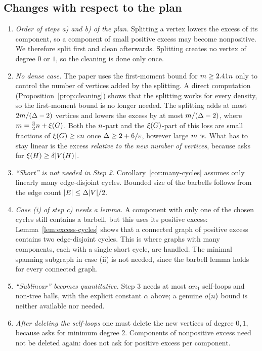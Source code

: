 \documentclass[11pt,a4paper]{article}
\theoremstyle{definition}
\theoremstyle{remark}
\theoremstyle{plain}
\theoremstyle{definition}
\begin{document}
\subsection{Changes with respect to the plan}
\begin{enumerate}[label=(\arabic*)]
\item \emph{Order of steps a) and b) of the plan.} Splitting a vertex lowers the excess of its
  component, so a component of small positive excess may become nonpositive.
  We therefore split first and clean afterwards. Splitting creates no vertex
  of degree \(0\) or \(1\), so the cleaning is done only once.
\item \emph{No dense case.} The paper uses the first-moment bound for
  \(m\ge2.41n\) only to control the number of vertices added by the splitting.
  A direct computation (Proposition~\ref{prop:cleaning}) shows that the
  splitting works for every density, so the first-moment bound is no longer
  needed. The splitting adds at most \(2m/(\Delta-2)\) vertices and lowers the
  excess by at most \(m/(\Delta-2)\), where \(m=\frac32n+\xi(G)\). Both the
  \(n\)-part and the \(\xi(G)\)-part of this loss are small fractions of
  \(\xi(G)\ge\varepsilon n\) once \(\Delta\ge2+6/\varepsilon\), however large
  \(m\) is. What has to stay linear is the excess \emph{relative to the new
  number of vertices}, because \Hyp{} asks for \(\xi(H)\ge\delta|V(H)|\).
\item \emph{``Short'' is not needed in Step 2.} Corollary~\ref{cor:many-cycles}
  assumes only linearly many edge-disjoint cycles. Bounded size of the barbells
  follows from the edge count \(|E|\le\Delta|V|/2\).
\item \emph{Case (i) of step c) needs a lemma.} A component with only one of
  the chosen cycles still contains a barbell, but this uses its positive excess:
  Lemma~\ref{lem:excess-cycles} shows that a connected graph of positive
  excess contains two edge-disjoint cycles. This is where graphs with many
  components, each with a single short cycle, are handled. The minimal
  spanning subgraph in case (ii) is not needed, since the barbell lemma holds
  for every connected graph.
\item \emph{``Sublinear'' becomes quantitative.} Step 3 needs at most
  \(\alpha n_1\) self-loops and non-tree balls, with the explicit constant
  \(\alpha\) above; a genuine \(o(n)\) bound is neither available nor needed.
\item \emph{After deleting the self-loops} one must delete the new vertices of
  degree \(0,1\), because \Hyp{} asks for minimum degree \(2\). Components of
  nonpositive excess need not be deleted again: \Hyp{} does not ask for
  positive excess per component.
\end{enumerate}
\end{document}

